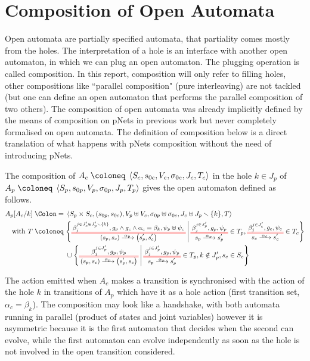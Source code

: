 \documentclass{article}
\begin{document}
\section{Composition of Open Automata}\label{sec:comp}
Open automata are partially specified automata, that partiality comes mostly from the holes.
The interpretation of a hole is an interface with another open automaton, in which we can plug an open automaton.
The plugging operation is called composition.
In this report, composition will only refer to filling holes, other compositions like ``parallel composition" (pure interleaving) are not tackled (but one can define an open automaton that performs the parallel composition of two others).
The composition of open automata was already implicitly defined by the means of composition on pNets in previous work \cite{henrio:01299562} but never completely formalised on open automata.
The definition of composition below is a direct translation of what happens with pNets composition without the need of introducing pNets.
\begin{defi}
The composition of \(A_c \defobject \OAg[c]\) in the hole \(k \in J_p\) of \(A_p \defobject \OAg[p]\) gives the open automaton defined as follows.
\begin{align*}
	A_p\subst{A_c}{k} \defnotation & \OA{S_p \times S_c}{\mpar{s_{0p}, s_{0c}}}{V_p \uplus V_c}{\sigma_{0p} \uplus \sigma_{0c}}{J_c \uplus J_p \setminus \mbrc{k}}{T} \\
	\text{with } T \defobject & \mset{\OT{\mpar{s_p, s_c}}{\mpar{s'_p, s'_c}}{\alpha_p}{\beta_j^{j \in J'_c \uplus J'_p \setminus \mbrc{k}}}{g_p \wedge g_c \wedge \alpha_c = \beta_k}{\psi_p \uplus \psi_c}}{\OTx{p}{}{}{p} \in T_p, \OTx{c}{}{}{c} \in T_c} \\
	& \cup \mset{\OT{\mpar{s_p, s_c}}{\mpar{s'_p, s_c}}{\alpha_p}{\beta_j^{j \in J'_p}}{g_p}{\psi_p}}{\OTx{p}{}{}{p} \in T_p, k \notin J'_p, s_c \in S_c}
\end{align*}
\end{defi}
The action emitted when \(A_c\) makes a transition is synchronised with the action of the hole \(k\) in transitions of \(A_p\) which have it as a hole action (first transition set, \(\alpha_c = \beta_k\)).
The composition may look like a handshake, with both automata running in parallel (product of states and joint variables) however it is asymmetric because it is the first automaton that decides when the second can evolve, while the first automaton can evolve independently as soon as the hole is not involved in the open transition considered.
\end{document}
